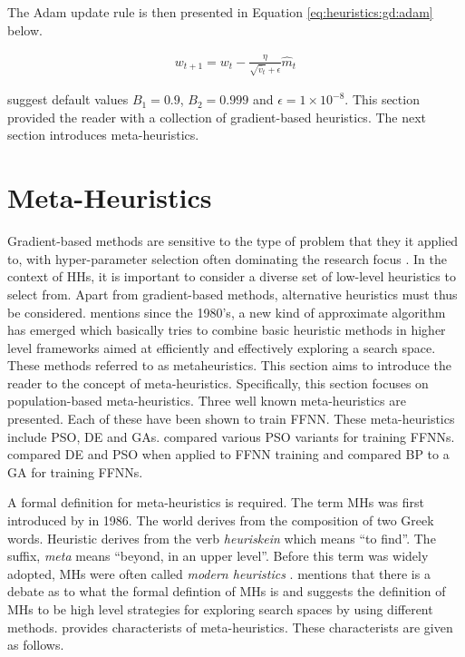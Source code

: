 The \ac{Adam} update rule is then presented in Equation \ref{eq:heuristics:gd:adam} below.

\begin{equation}
      \label{eq:heuristics:gd:adam}
      \begin{split}
            w_{t+1} = w_{t} - \frac{\eta}{\sqrt{\hat{v}_{t}} + \epsilon}\hat{m}_{t}
      \end{split}
\end{equation}

\citeauthor{ref:kingma:2014} \cite{ref:kingma:2014} suggest default values $B_{1}=0.9$, $B_{2}=0.999$ and $\epsilon = 1 \times 10^{-8}$. This section provided the reader with a collection of gradient-based heuristics. The next section introduces meta-heuristics.

\section{Meta-Heuristics}
\label{sec:heuristics:mh}

Gradient-based methods are sensitive to the type of problem that they it applied to, with hyper-parameter selection often dominating the research focus \cite{ref:bengio:2000}\cite{ref:feurer:2019}. In the context of \acp{HH}, it is important to consider a diverse set of low-level heuristics to select from. Apart from gradient-based methods, alternative heuristics must thus be considered. \cite{ref:blum:2003} mentions since the 1980's, a new kind of approximate algorithm has emerged which basically tries to combine basic heuristic methods in higher level frameworks aimed at efficiently and effectively exploring a search space. These methods referred to as metaheuristics. This section aims to introduce the reader to the concept of meta-heuristics. Specifically, this section focuses on population-based meta-heuristics. Three well known meta-heuristics are presented. Each of these have been shown to train \ac{FFNN}. These meta-heuristics include \ac{PSO}, \ac{DE} and \acp{GA}. \cite{ref:carvalho:2006} compared various \ac{PSO} variants for training \acp{FFNN}. \cite{ref:espinal:2011} compared \ac{DE} and \ac{PSO} when applied to \ac{FFNN} training and \cite{ref:gupta:1999} compared \ac{BP} to a \ac{GA} for training \acp{FFNN}.

A formal definition for meta-heuristics is required. The term \aclp{MH} was first introduced by \citeauthor{ref:glover:1986}\cite{ref:glover:1986} in 1986. The world derives from the composition of two Greek words. Heuristic derives from the verb \textit{heuriskein} which means ``to find''. The suffix, \textit{meta} means ``beyond, in an upper level''. Before this term was widely adopted, \acp{MH} were often called \textit{modern heuristics} \cite{ref:reeves:1993}. \cite{ref:blum:2003} mentions that there is a debate as to what the formal defintion of \acp{MH} is and suggests the definition of \acp{MH} to be high level strategies for exploring search spaces by using different methods. \citeauthor{ref:blum:2003} \cite{ref:blum:2003} provides characterists of meta-heuristics. These characterists are given as follows.

